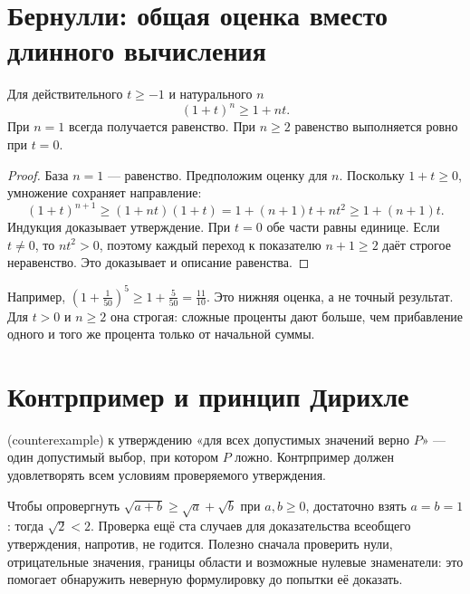 \section{Бернулли: общая оценка вместо длинного вычисления}
\begin{theorem}\label{thm:legacy-c17-4}
Для действительного \(t\ge-1\) и натурального \(n\)
\[
(1+t)^n\ge1+nt.
\]
При \(n=1\) всегда получается равенство. При \(n\ge2\) равенство выполняется ровно при \(t=0\).
\end{theorem}
\begin{proof}
База \(n=1\) — равенство. Предположим оценку для \(n\). Поскольку \(1+t\ge0\), умножение сохраняет направление:
\[
(1+t)^{n+1}\ge(1+nt)(1+t)=1+(n+1)t+nt^2\ge1+(n+1)t.
\]
Индукция доказывает утверждение. При \(t=0\) обе части равны единице. Если \(t\ne0\), то \(nt^2>0\), поэтому каждый переход к показателю \(n+1\ge2\) даёт строгое неравенство. Это доказывает и описание равенства.
\end{proof}
Например, \((1+\frac1{50})^5\ge1+\frac5{50}=\frac{11}{10}\). Это нижняя оценка, а не точный результат. Для \(t>0\) и \(n\ge2\) она строгая: сложные проценты дают больше, чем прибавление одного и того же процента только от начальной суммы.

\section{Контрпример и принцип Дирихле}
\begin{definition}
 (counterexample) к утверждению «для всех допустимых значений верно \(P\)» — один допустимый выбор, при котором \(P\) ложно. Контрпример должен удовлетворять всем условиям проверяемого утверждения.
\end{definition}
Чтобы опровергнуть \(\sqrt{a+b}\ge\sqrt a+\sqrt b\) при \(a,b\ge0\), достаточно взять \(a=b=1\): тогда \(\sqrt2<2\). Проверка ещё ста случаев для доказательства всеобщего утверждения, напротив, не годится. Полезно сначала проверить нули, отрицательные значения, границы области и возможные нулевые знаменатели: это помогает обнаружить неверную формулировку до попытки её доказать.

